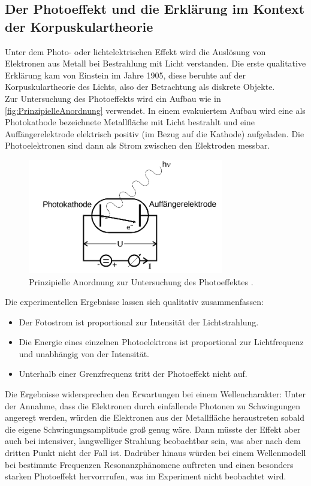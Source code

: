 \subsection{Der Photoeffekt und die Erklärung im Kontext der Korpuskulartheorie}
\label{sec:Der Photoeffekt und die Erklärung im Kontext der Korpuskulartheorie}
Unter dem Photo- oder lichtelektrischen Effekt wird die Auslösung von Elektronen aus
Metall bei Bestrahlung mit Licht verstanden. Die erste qualitative Erklärung kam von Einstein im
Jahre 1905, diese beruhte auf der Korpuskulartheorie des Lichts, also der Betrachtung als
diskrete Objekte.
\\
Zur Untersuchung des Photoeffekts wird ein Aufbau wie in
\autoref{fig:PrinzipielleAnordnung} verwendet. In einem evakuiertem Aufbau wird eine als
Photokathode bezeichnete Metallfläche mit Licht bestrahlt und eine Auffängerelektrode
elektrisch positiv (im Bezug auf die Kathode) aufgeladen. Die Photoelektronen sind dann
als Strom zwischen den Elektroden messbar.
\begin{figure}
	\centering
	\includegraphics[height=5cm]{pictures/PrinzipielleAnordnung.png}
	\caption{Prinzipielle Anordnung zur Untersuchung des Photoeffektes
	\cite{anleitung}.}
	\label{fig:PrinzipielleAnordnung}
\end{figure}
Die experimentellen Ergebnisse lassen sich qualitativ zusammenfassen:
\begin{itemize}
	\item Der Fotostrom ist proportional zur Intensität der Lichtstrahlung.
	\item Die Energie eines einzelnen Photoelektrons ist proportional zur
		Lichtfrequenz und unabhängig von der Intensität.
	\item Unterhalb einer Grenzfrequenz tritt der Photoeffekt nicht auf.
\end{itemize}
Die Ergebnisse widersprechen den Erwartungen bei einem Wellencharakter: Unter der Annahme,
dass die Elektronen durch einfallende Photonen zu Schwingungen angeregt werden, würden
die Elektronen aus der Metallfläche heraustreten sobald die eigene Schwingungsamplitude groß
genug wäre. Dann müsste der Effekt aber auch  bei intensiver, langwelliger Strahlung
beobachtbar sein, was aber nach dem dritten Punkt nicht der Fall ist. Dadrüber hinaus
würden bei einem Wellenmodell bei bestimmte Frequenzen Resonanzphänomene auftreten und einen 
besonders starken Photoeffekt hervorrrufen, was im Experiment nicht beobachtet wird.

